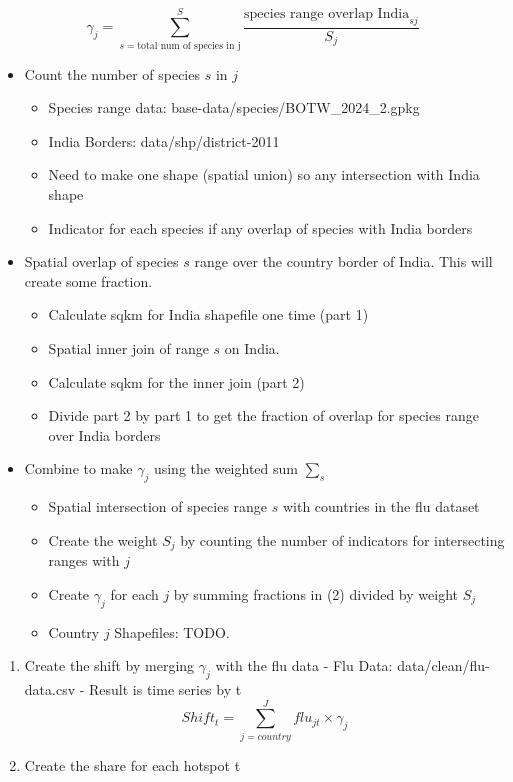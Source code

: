 \documentclass[
  letterpaper,
]{article}
\providecommand{\tightlist}{%
  \setlength{\itemsep}{0pt}\setlength{\parskip}{0pt}}\usepackage{longtable,booktabs,array}
\begin{document}
\begin{tcolorbox}
\[
\gamma_j = \sum_{s =\text{total num of species in j}}^S \frac{\text{species range overlap India}_{sj}}{S_j}
\]

\begin{itemize}
\tightlist
\item
  Count the number of species \(s\) in \(j\)

  \begin{itemize}
  \tightlist
  \item
    Species range data: base-data/species/BOTW\_2024\_2.gpkg
  \item
    India Borders: data/shp/district-2011
  \item
    Need to make one shape (spatial union) so any intersection with
    India shape
  \item
    Indicator for each species if any overlap of species with India
    borders
  \end{itemize}
\item
  Spatial overlap of species \(s\) range over the country border of
  India. This will create some fraction.

  \begin{itemize}
  \tightlist
  \item
    Calculate sqkm for India shapefile one time (part 1)
  \item
    Spatial inner join of range \(s\) on India.
  \item
    Calculate sqkm for the inner join (part 2)
  \item
    Divide part 2 by part 1 to get the fraction of overlap for species
    range over India borders
  \end{itemize}
\item
  Combine to make \(\gamma_j\) using the weighted sum \(\sum_s\)

  \begin{itemize}
  \tightlist
  \item
    Spatial intersection of species range \(s\) with countries in the
    flu dataset
  \item
    Create the weight \(S_j\) by counting the number of indicators for
    intersecting ranges with \(j\)
  \item
    Create \(\gamma_j\) for each \(j\) by summing fractions in (2)
    divided by weight \(S_j\)
  \item
    Country \(j\) Shapefiles: TODO.
  \end{itemize}
\end{itemize}

\begin{enumerate}
\def\labelenumi{\arabic{enumi}.}
\item
  Create the shift by merging \(\gamma_j\) with the flu data - Flu Data:
  data/clean/flu-data.csv - Result is time series by t \[
  Shift_t = \sum_{j = country}^J flu_{jt} \times \gamma_j
  \]
\item
  Create the share for each hotspot t
\end{enumerate}


\end{tcolorbox}
\end{document}
